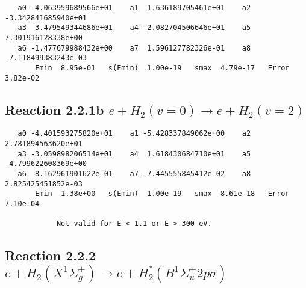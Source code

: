 \documentclass[12pt]{article}
\begin{document}
\begin{small}\begin{verbatim}
   a0 -4.063959689566e+01    a1  1.636189705461e+01    a2 -3.342841685940e+01
   a3  3.479549344686e+01    a4 -2.082704506646e+01    a5  7.301916128338e+00
   a6 -1.477679988432e+00    a7  1.596127782326e-01    a8 -7.118499383243e-03
       Emin  8.95e-01   s(Emin)  1.00e-19   smax  4.79e-17   Error  3.82e-02
\end{verbatim}\end{small}




\newpage
\subsection{
Reaction 2.2.1b $   e + H_2(v=0) \rightarrow e + H_2(v=2)$}



\begin{small}\begin{verbatim}
   a0 -4.401593275820e+01    a1 -5.428337849062e+00    a2  2.781894563620e+01
   a3 -3.059898206514e+01    a4  1.618430684710e+01    a5 -4.799622608369e+00
   a6  8.162961901622e-01    a7 -7.445555845412e-02    a8  2.825425451852e-03
       Emin  1.38e+00   s(Emin)  1.00e-19   smax  8.61e-18   Error  7.10e-04

            Not valid for E < 1.1 or E > 300 eV.
\end{verbatim}\end{small}





\newpage
\subsection{Reaction 2.2.2 $e + H_2(X^1\Sigma_g^+) \rightarrow e + H_2^*(B^1\Sigma_u^+2p\sigma)$}






\end{document}
